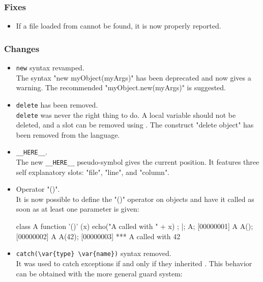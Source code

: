 \subsubsection{Fixes}

\begin{itemize}
\item If a file loaded from  cannot be found, it is now
  properly reported.
\end{itemize}


\subsubsection{Changes}

\begin{itemize}
\item \lstinline|new| syntax revamped.\\
  The syntax "new myObject(myArgs)" has been deprecated and now gives a
  warning. The recommended "myObject.new(myArgs)" is suggested.

\item \lstinline|delete| has been removed.\\
  \lstinline|delete| was never the right thing to do. A local variable
  should not be deleted, and a slot can be removed using
  .  The construct "delete object" has been
  removed from the language.

\item \lstinline|__HERE__|.\\
  The new \lstinline|__HERE__| pseudo-symbol gives the current position.  It
  features three self explanatory slots: "file", "line", and "column".

\item Operator "()".\\
  It is now possible to define the "()" operator on objects and have it
  called as soon as at least one parameter is given:

\begin{urbiscript}
class A {
  function '()' (x) { echo("A called with " + x) };
}|;
A;
[00000001] A
A();
[00000002] A
A(42);
[00000003] *** A called with 42
\end{urbiscript}

\item \lstinline|catch(\var{type} \var{name})| syntax removed.\\
  It was used to catch exceptions if and only if they inherited
  . This behavior can be obtained with the more general guard
  system:


\end{itemize}
